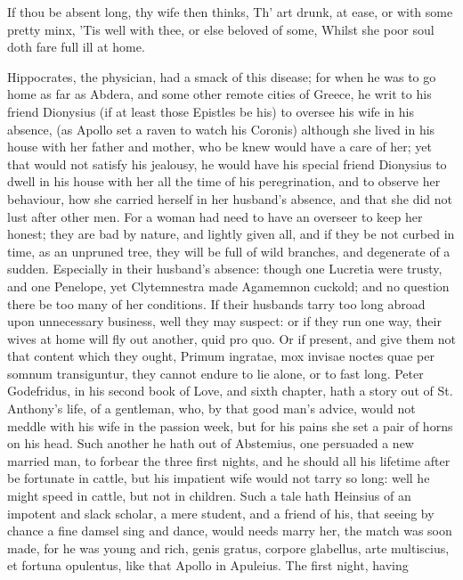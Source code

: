 {If thou be absent long, thy wife then thinks,
Th' art drunk, at ease, or with some pretty minx,
'Tis well with thee, or else beloved of some,
Whilst she poor soul doth fare full ill at home.

Hippocrates, the physician, had a smack of this disease; for when he
was to go home as far as Abdera, and some other remote cities of
Greece, he writ to his friend Dionysius (if at least those
Epistles be his)  to oversee his wife in his absence, (as
Apollo set a raven to watch his Coronis) although she lived in his
house with her father and mother, who be knew would have a care of her;
yet that would not satisfy his jealousy, he would have his special
friend Dionysius to dwell in his house with her all the time of his
peregrination, and to observe her behaviour, how she carried herself in
her husband's absence, and that she did not lust after other men.
For a woman had need to have an overseer to keep her honest; they
are bad by nature, and lightly given all, and if they be not curbed in
time, as an unpruned tree, they will be full of wild branches, and
degenerate of a sudden. Especially in their husband's absence: though
one Lucretia were trusty, and one Penelope, yet Clytemnestra made
Agamemnon cuckold; and no question there be too many of her conditions.
If their husbands tarry too long abroad upon unnecessary business, well
they may suspect: or if they run one way, their wives at home will fly
out another, quid pro quo. Or if present, and give them not that
content which they ought, Primum ingratae, mox invisae noctes
quae per somnum transiguntur, they cannot endure to lie alone, or to
fast long.  Peter Godefridus, in his second book of Love, and
sixth chapter, hath a story out of St. Anthony's life, of a gentleman,
who, by that good man's advice, would not meddle with his wife in the
passion week, but for his pains she set a pair of horns on his head.
Such another he hath out of Abstemius, one persuaded a new married man,
to forbear the three first nights, and he should all his lifetime
after be fortunate in cattle, but his impatient wife would not tarry so
long: well he might speed in cattle, but not in children. Such a tale
hath Heinsius of an impotent and slack scholar, a mere student, and a
friend of his, that seeing by chance a fine damsel sing and dance,
would needs marry her, the match was soon made, for he was young and
rich, genis gratus, corpore glabellus, arte multiscius, et fortuna
opulentus, like that Apollo in Apuleius. The first night, having
}
